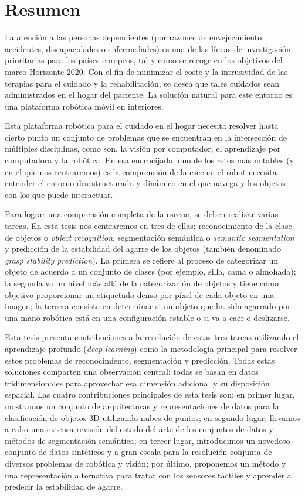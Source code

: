 \chapter{Resumen}

La atención a las personas dependientes (por razones de envejecimiento, accidentes, discapacidades o enfermedades) es una de las líneas de investigación prioritarias para los países europeos, tal y como se recoge en los objetivos del marco Horizonte 2020. Con el fin de minimizar el coste y la intrusividad de las terapias para el cuidado y la rehabilitación, se desea que tales cuidados sean administrados en el hogar del paciente. La solución natural para este entorno es una plataforma robótica móvil en interiores.

Esta plataforma robótica para el cuidado en el hogar necesita resolver hasta cierto punto un conjunto de problemas que se encuentran en la intersección de múltiples disciplinas, como son, la visión por computador, el aprendizaje por computadora y la robótica. En esa encrucijada, uno de los retos más notables (y en el que nos centraremos) es la comprensión de la escena: el robot necesita entender el entorno desestructurado y dinámico en el que navega y los objetos con los que puede interactuar.

Para lograr una comprensión completa de la escena, se deben realizar varias tareas. En esta tesis nos centraremos en tres de ellas: reconocimiento de la clase de objetos o \emph{object recognition}, segmentación semántica o \emph{semantic segmentation} y predicción de la estabilidad del agarre de los objetos (también denominado \emph{grasp stability prediction}). La primera se refiere al proceso de categorizar un objeto de acuerdo a un conjunto de clases (por ejemplo, silla, cama o almohada); la segunda va un nivel más allá de la categorización de objetos y tiene como objetivo proporcionar un etiquetado denso por píxel de cada objeto en una imagen; la tercera consiste en determinar si un objeto que ha sido agarrado por una mano robótica está en una configuración estable o si va a caer o deslizarse.

Esta tesis presenta contribuciones a la resolución de estas tres tareas utilizando el aprendizaje profundo (\emph{deep learning}) como la metodología principal para resolver estos problemas de reconocimiento, segmentación y predicción. Todas estas soluciones comparten una observación central: todas se basan en datos tridimensionales para aprovechar esa dimensión adicional y su disposición espacial. Las cuatro contribuciones principales de esta tesis son: en primer lugar, mostramos un conjunto de arquitecturas y representaciones de datos para la clasificación de objetos 3D utilizando nubes de puntos; en segundo lugar, llevamos a cabo una extensa revisión del estado del arte de los conjuntos de datos y métodos de segmentación semántica; en tercer lugar, introducimos un novedoso conjunto de datos sintéticos y a gran escala para la resolución conjunta de diversos problemas de robótica y visión; por último, proponemos un método y una representación alternativa para tratar con los sensores táctiles y aprender a predecir la estabilidad de agarre.